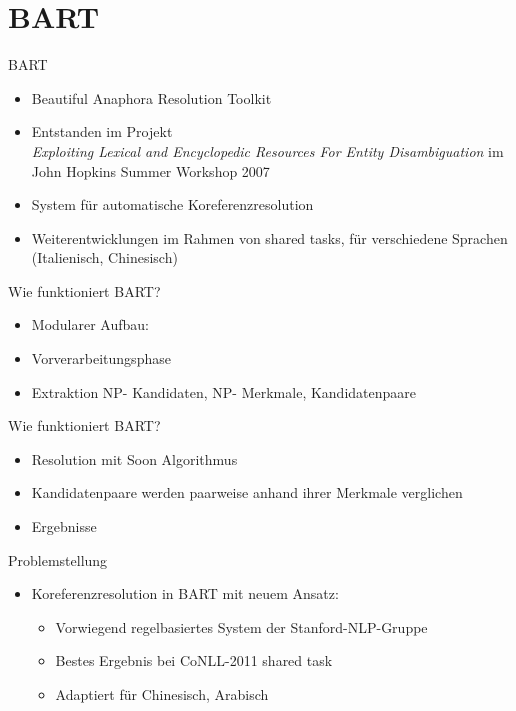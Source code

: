\documentclass[11pt,a4paper]{beamer}
\begin{document}
\section{BART}
\begin{frame}{BART}
\begin{itemize}
\item Beautiful Anaphora Resolution Toolkit
\item Entstanden im Projekt\\ \textit{Exploiting Lexical and Encyclopedic Resources For Entity Disambiguation} 
im John Hopkins Summer Workshop 2007
\item System für automatische Koreferenzresolution
\item Weiterentwicklungen im Rahmen von shared tasks, für verschiedene Sprachen (Italienisch, Chinesisch)
\end{itemize}
\end{frame}

\begin{frame}{Wie funktioniert BART?}
\begin{itemize}
\item Modularer Aufbau: 
\item Vorverarbeitungsphase
\item Extraktion NP- Kandidaten, NP- Merkmale, Kandidatenpaare
\end{itemize}
\end{frame}

\begin{frame}{Wie funktioniert BART?}
\begin{itemize}
\item Resolution mit Soon Algorithmus 
\item Kandidatenpaare werden paarweise anhand ihrer Merkmale verglichen
\item Ergebnisse
\end{itemize}
\end{frame}

\begin{frame}{Problemstellung}
\begin{itemize}
\item Koreferenzresolution in BART mit neuem Ansatz: 
\begin{itemize}
\item Vorwiegend regelbasiertes System der Stanford-NLP-Gruppe
\item Bestes Ergebnis bei CoNLL-2011 shared task
\item Adaptiert für Chinesisch, Arabisch
\end{itemize}
\end{itemize}
\end{frame}
\end{document}
